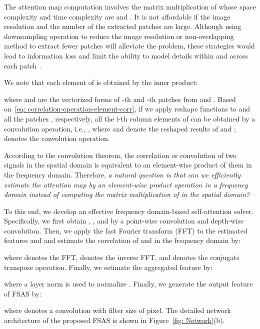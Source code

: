 \documentclass[10pt,twocolumn,letterpaper]{article}
\begin{document}
The attention map computation involves the matrix multiplication of  whose space complexity and time complexity are  and .
It is not affordable if the image resolution and the number of the extracted patches are large.
Although using downsampling operation to reduce the image resolution or non-overlapping method to extract fewer patches will alleviate the problem,
these strategies would lead to information loss and limit the ability to model details within and across each patch~\cite{cotransformer}.

We note that each element of  is obtained by the inner product:

where  and  are the vectorized forms of -th and -th patches from  and .
Based on~\eqref{eq: correlation-operation-element-corr}, if we apply reshape functions to  and all the patches , respectively, all the i-th column elements of  can be obtained by a convolution operation, i.e., , where  and  denote the reshaped results of  and ;  denotes the convolution operation.


According to the convolution theorem, the correlation or convolution of two signals in the spatial domain is equivalent to an element-wise product of them in the frequency domain.
Therefore, \textit{a natural question is that can we efficiently estimate the attention map by an element-wise product operation in a frequency domain instead of computing the matrix multiplication of  in the spatial domain? }


To this end, we develop an effective frequency domain-based self-attention solver.
Specifically, we first obtain , , and  by a  point-wise convolution and  depth-wise convolution. Then, we apply the fast Fourier transform (FFT) to the estimated features  and  and estimate the correlation of  and  in the frequency domain by:

where  denotes the FFT,  denotes the inverse FFT, and  denotes the conjugate transpose operation.
Finally, we estimate the aggregated feature by:

where a layer norm  is used to normalize .
Finally, we generate the output feature of FSAS by:

where  denotes a convolution with filter size of  pixel.
The detailed network architecture of the proposed FSAS is shown in Figure~\ref{fig: Network}(b).
\end{document}

